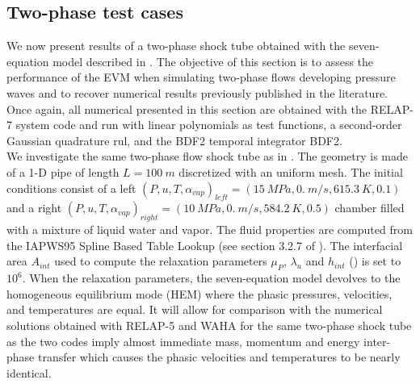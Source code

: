\documentclass{inputs/mc2015}
\begin{document}
\subsection{Two-phase test cases} \label{sec:2-phase-problems}
%
We now present results of a two-phase shock tube obtained with the seven-equation model described in . %
The objective of this section is to assess the performance of the EVM when simulating two-phase flows developing pressure waves and to recover numerical results previously published in the literature. Once again, all numerical presented in this section are obtained with the RELAP-7 system code and run with linear polynomials as test functions, a second-order Gaussian quadrature rul, and the BDF2 temporal integrator BDF2. \\
We investigate the same two-phase flow shock tube as in \cite{Sokolowski-Koszela, waha-manual}. The geometry is made of a 1-D pipe of length $L = 100\ m$ discretized with an uniform mesh. The initial conditions consist of a left $(P, u, T, \alpha_{vap})_{left} = (15 \ MPa, 0. \ m/s, 615.3 \ K, 0.1)$ and a right $(P, u, T, \alpha_{vap})_{right} = (10 \ MPa, 0. \ m/s, 584.2 \ K, 0.5)$ chamber filled with a mixture of liquid water and vapor. The fluid properties are computed from the IAPWS95 Spline Based Table Lookup (see section 3.2.7 of \cite{relap7-manual}). The interfacial area $A_{int}$ used to compute the relaxation parameters $\mu_P$, $\lambda_u$ and $h_{int}$ () is set to $10^6$. 
 When the relaxation parameters, the seven-equation model devolves to the homogeneous equilibrium mode (HEM) where the phasic pressures, velocities, and temperatures are equal. It will allow for comparison with the numerical solutions obtained with RELAP-5 \cite{Sokolowski-Koszela} and WAHA \cite{waha-manual} for the same two-phase shock tube as the two codes imply almost immediate mass, momentum and energy inter-phase transfer which causes the phasic velocities and temperatures to be nearly identical. 
\end{document}
